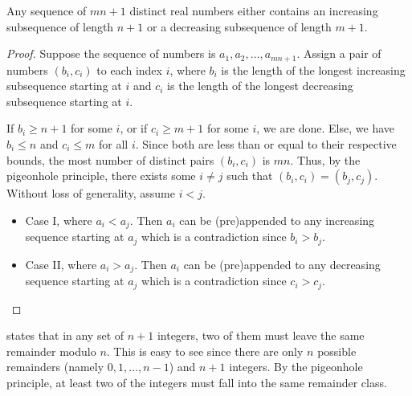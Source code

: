 \begin{theorem}
    Any sequence of $mn+1$ distinct real numbers either contains an increasing subsequence of length $n+1$ or a decreasing subsequence of length $m+1$.
\end{theorem}

\begin{proof}
    Suppose the sequence of numbers is $a_{1},a_{2},\ldots,a_{mn+1}$. Assign a pair of numbers $(b_{i},c_{i})$ to each index $i$, where $b_{i}$ is the length of the longest increasing subsequence starting at $i$ and $c_{i}$ is the length of the longest decreasing subsequence starting at $i$.

    If $b_{i} \geq n + 1$ for some $i$, or if $c_{i} \geq m + 1$ for some $i$, we are done. Else, we have $b_{i} \leq n$ and $c_{i} \leq m$ for all $i$. Since both are less than or equal to their respective bounds, the most number of distinct pairs $(b_{i},c_{i})$ is $mn$. Thus, by the pigeonhole principle, there exists some $i \neq j$ such that $(b_{i},c_{i}) = (b_{j},c_{j})$. Without loss of generality, assume $i < j$.
    \begin{itemize}
        \item Case I, where $a_{i} < a_{j}$. Then $a_{i}$ can be (pre)appended to any increasing sequence starting at $a_{j}$ which is a contradiction since $b_{i} > b_{j}$.
        \item Case II, where $a_{i} > a_{j}$. Then $a_{i}$ can be (pre)appended to any decreasing sequence starting at $a_{j}$ which is a contradiction since $c_{i} > c_{j}$.
    \end{itemize}
\end{proof}

 states that in any set of $n+1$ integers, two of them must leave the same remainder modulo $n$. This is easy to see since there are only $n$ possible remainders (namely $0, 1, \ldots, n-1$) and $n+1$ integers. By the pigeonhole principle, at least two of the integers must fall into the same remainder class.